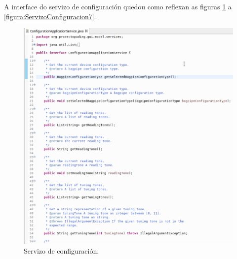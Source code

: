    A interface do servizo de configuración quedou como reflexan as figuras
   \ref{figura:ServizoConfiguracion1} a \ref{figura:ServizoConfiguracion7}. \\
   
   \begin{figure}[htbp]
    \centering
    \includegraphics[scale=0.6, keepaspectratio=true]{./imagenes/servizo-configuracion-1.png}
    \caption{Servizo de configuración.}
    \label{figura:ServizoConfiguracion1}
   \end{figure}
   
